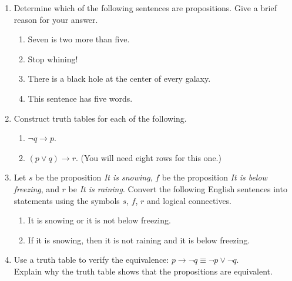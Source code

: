 \documentclass[11pt]{amsart}
\begin{document}
\begin{enumerate}


\item Determine which of the following sentences are propositions. Give a brief reason for your answer.
\begin{enumerate} 

\item Seven is two more than five.

\item Stop whining!

\item There is a black hole at the center of every galaxy.

\item This sentence has five words. \\[10pt]

\end{enumerate}


\item Construct truth tables for each of the following.

\begin{enumerate} 

\item$\neg q\longrightarrow p$.

\item $(p\lor q)\longrightarrow  r$. 
(You will need eight rows for this one.)\\[10pt]

\end{enumerate}


\item Let $s$ be the proposition {\itshape It is snowing}, $f$ be the proposition 
{\itshape It is below freezing}, and $r$ be {\itshape It is raining}. Convert the following English sentences into statements
using the symbols $s$, $f$, $r$ and logical connectives.

\begin{enumerate}

\item It is snowing or it is not below freezing.

\item If it is snowing, then it is not raining and it is below freezing.\\[10pt]

\end{enumerate}

\item  Use a truth table to verify  the  equivalence:
$p\longrightarrow \neg q\equiv \neg p\lor\neg q$.\\
Explain why the truth table shows that the propositions are equivalent.\\[10pt]


\end{enumerate}
\end{document}
